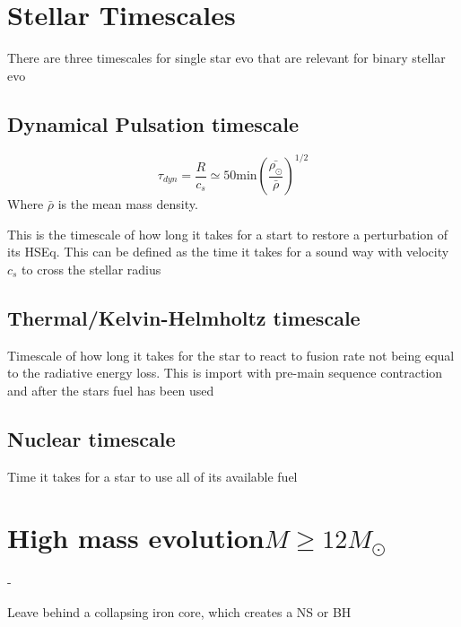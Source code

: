 \section{Stellar Timescales}
There are three timescales for single star evo that are relevant for binary stellar evo

\subsection{Dynamical Pulsation timescale}


\begin{theorem}

  \[\tau_{dyn} = \frac{R}{c_s} \simeq 50 \text{min}\left(\frac{\bar{\rho_{\odot}}}{\bar{\rho}}\right)^{1/2}\]
  Where \(\bar{\rho}\) is the mean mass density.

  This is the timescale of how long it takes for a start to restore a perturbation of its HSEq. This can be defined as the time it takes for a sound way with velocity \(c_s\) to cross the stellar radius
\end{theorem}

\subsection{Thermal/Kelvin-Helmholtz timescale}
Timescale of how long it takes for the star to react to fusion rate not being equal to the radiative energy loss. This is import with pre-main sequence contraction and after the stars fuel has been used

\subsection{Nuclear timescale}
Time it takes for a star to use all of its available fuel

\section{High mass evolution\(M \geq 12M_\odot\)}
\begin{list}{-}{}
\item Leave behind a collapsing iron core, which creates a NS or BH 
\item 
\end{list}

